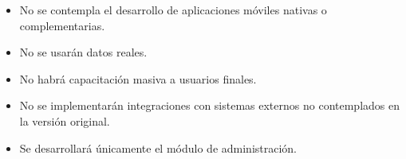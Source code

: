 \begin{itemize}
    \item No se contempla el desarrollo de aplicaciones móviles nativas o complementarias.
    \item No se usarán datos reales.
    \item No habrá capacitación masiva a usuarios finales.
    \item No se implementarán integraciones con sistemas externos no contemplados en la versión original.
    \item Se desarrollará únicamente el módulo de administración.
\end{itemize}



